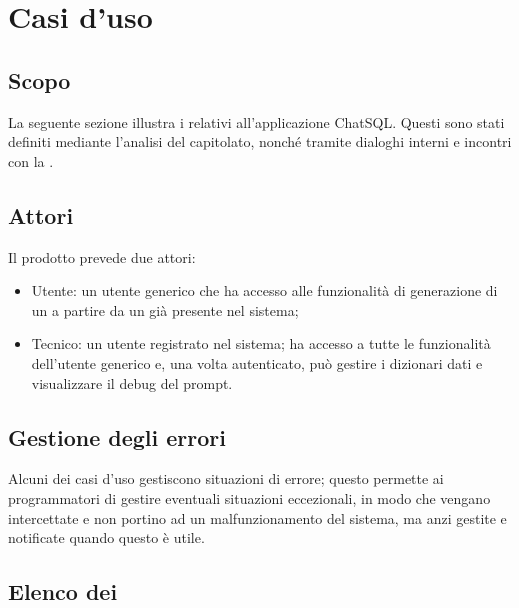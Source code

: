 \section{Casi d'uso}

\subsection{Scopo}
La seguente sezione illustra i  relativi all'applicazione ChatSQL. Questi sono stati definiti mediante l'analisi del capitolato, nonché tramite dialoghi interni e incontri con la .

\subsection{Attori}
Il prodotto prevede due attori:
\begin{itemize}
  \item Utente: un utente generico che ha accesso alle funzionalità di generazione di un  a partire da un  già presente nel sistema; 
  \item Tecnico: un utente registrato nel sistema; ha accesso a tutte le funzionalità dell'utente generico e, una volta autenticato, può gestire i dizionari dati e visualizzare il debug del prompt.
\end{itemize}

\subsection{Gestione degli errori}
Alcuni dei casi d'uso gestiscono situazioni di errore; questo permette ai programmatori di gestire eventuali situazioni eccezionali, in modo che vengano intercettate e non portino ad un malfunzionamento del sistema, ma anzi gestite e notificate quando questo è utile.

\subsection{Elenco dei }














